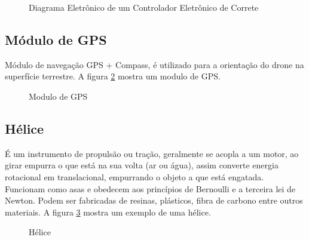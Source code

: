 \begin{figure}[H]
	\centering
	\caption{Diagrama Eletrônico de um Controlador Eletrônico de Correte}
	\def\svgwidth{15cm}
	
	\label{fig:motordrive}
\end{figure}

\subsection{Módulo de GPS}
Módulo de navegação GPS + Compass, é utilizado para a orientação do drone na superfície terrestre. A figura \ref{fig:gps} mostra um modulo de GPS.
\begin{figure}[H]
	\centering
	\caption{Modulo de GPS}
	\fontsize{9pt}{12pt}\selectfont
	\def\svgwidth{12cm}
	
	\label{fig:gps}
\end{figure}

\subsection{Hélice}
É um instrumento de propulsão ou tração, geralmente se acopla a um motor, ao girar empurra o que está na sua volta (ar ou água), assim converte energia rotacional em translacional, empurrando o objeto a que está engatada. Funcionam como asas e obedecem aos princípios de Bernoulli e a terceira lei de Newton. Podem ser fabricadas de resinas, plásticos, fibra de carbono entre outros materiais. A figura \ref{fig:helice} mostra um exemplo de uma hélice.
\begin{figure}[H]
	\centering
	\caption{Hélice}
	\fontsize{9pt}{12pt}\selectfont
	\def\svgwidth{10cm}
	
	\label{fig:helice}
\end{figure}

